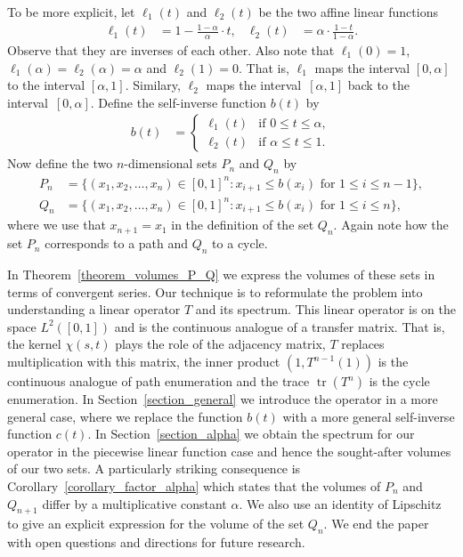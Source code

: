 \documentclass[11pt,reqno]{amsart}
\theoremstyle{definition}
\numberwithin{equation}{section}
\DeclareMathOperator{\trace}{tr}
\begin{document}
To be more explicit,
let $\ell_{1}(t)$ and $\ell_{2}(t)$
be the two affine linear functions
\begin{align*}
\ell_{1}(t)
& =
1-\frac{1-\alpha}{\alpha} \cdot t ,
&
\ell_{2}(t)
& =
\alpha \cdot \frac{1-t}{1-\alpha} .
\end{align*}
Observe that they are inverses of each other.
Also note that
$\ell_{1}(0) = 1$,
$\ell_{1}(\alpha) = \ell_{2}(\alpha) = \alpha$
and $\ell_{2}(1) = 0$.
That is, $\ell_{1}$ maps the interval $[0,\alpha]$
to the interval $[\alpha,1]$.
Similary, $\ell_{2}$ maps the interval~$[\alpha,1]$
back to the interval~$[0,\alpha]$.
Define the self-inverse function $b(t)$ by
\begin{align}
b(t)
& = 
\begin{cases}
\ell_{1}(t) & \text{if } 0 \leq t \leq \alpha, \\
\ell_{2}(t) & \text{if } \alpha \leq t \leq 1.
\end{cases}
\label{equation_b}
\end{align}
Now define the two $n$-dimensional sets $P_{n}$ and $Q_{n}$ by
\begin{align*}
P_{n}
& =
\{(x_{1},x_{2}, \ldots, x_{n}) \in [0,1]^{n} :
x_{i+1} \leq b(x_{i}) \text{ for } 1 \leq i \leq n-1\} , \\
Q_{n}
& =
\{(x_{1},x_{2}, \ldots, x_{n}) \in [0,1]^{n} :
x_{i+1} \leq b(x_{i}) \text{ for } 1 \leq i \leq n\} ,
\end{align*}
where we use that $x_{n+1} = x_{1}$ in the definition of the set $Q_{n}$.
Again note how the set $P_{n}$ corresponds to a path and $Q_{n}$ to a cycle.


In Theorem~\ref{theorem_volumes_P_Q} we express the
volumes of these sets in terms of convergent series.
Our technique is to reformulate the problem into
understanding a linear operator $T$ and its spectrum.
This linear operator is on the space $L^{2}([0,1])$
and is the continuous analogue of a transfer matrix.
That is, the kernel $\chi(s,t)$ plays the role of the adjacency matrix,
$T$ replaces multiplication with this matrix,
the inner product $(1,T^{n-1}(1))$
is the continuous analogue of path enumeration
and
the trace $\trace(T^{n})$
is the cycle enumeration.
In Section~\ref{section_general} we introduce the
operator in a more general case,
where we replace the function $b(t)$ with
a more general self-inverse function $c(t)$.
In Section~\ref{section_alpha} we obtain the
spectrum for our operator in the piecewise linear function case
and hence the sought-after volumes of our two sets.
A particularly striking consequence is
Corollary~\ref{corollary_factor_alpha}
which states that the volumes of $P_{n}$ and~$Q_{n+1}$
differ by a multiplicative constant $\alpha$.
We also use an identity of Lipschitz to give an explicit expression
for the volume of the set $Q_{n}$.
We end the paper with open questions and directions
for future research.
\end{document}
